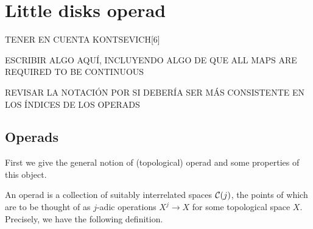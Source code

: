 \documentclass[TFM.tex]{subfiles}
\begin{document}
\chapter{Little disks operad}
TENER EN CUENTA KONTSEVICH[6] 

ESCRIBIR ALGO AQUÍ, INCLUYENDO ALGO DE QUE ALL MAPS ARE REQUIRED TO BE CONTINUOUS

REVISAR LA NOTACIÓN POR SI DEBERÍA SER MÁS CONSISTENTE EN LOS ÍNDICES DE LOS OPERADS


\section{Operads}
First we give the general notion of (topological) operad and some properties of this object.
%


An operad is a collection of suitably interrelated spaces $\mathcal{C}(j)$, the points of which are to
be thought of as $j$-adic operations $X^j \to X$ for some topological space $X$. Precisely, we have the following definition.
\end{document}
